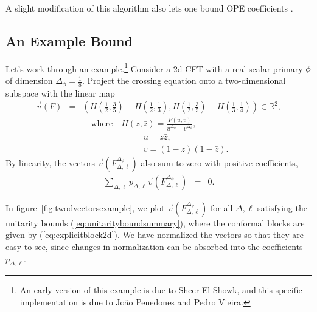 \documentclass{ws-rv9x6}
\newcommand\be{\begin{eqnarray}}
\newcommand\ee{\end{eqnarray}}
\newcommand\f\phi
\newcommand\p[1]{\left(#1\right)}
\newcommand\<\langle
\renewcommand\>\rangle
\newcommand\R{\mathbb{R}}
\newcommand\nn{\nonumber}
\renewcommand\.{\cdot}
\newcommand\De{\Delta}
\begin{document}
A slight modification of this algorithm also lets one bound OPE coefficients \cite{Caracciolo:2009bx}.

\subsection{An Example Bound}
\label{sec:boundsexample}

Let's work through an example.\footnote{An early version of this example is due to Sheer El-Showk, and this specific implementation is due to Jo\~ao Penedones and Pedro Vieira.}  Consider a 2d CFT with a real scalar primary $\f$ of dimension $\De_\f=\frac 1 8$.
Project the crossing equation onto a two-dimensional subspace with the linear map
\be
\label{eq:vecv}
\vec v(F) &=& \p{H\p{\frac 1 2,\frac 3 5} - H\p{\frac 1 2, \frac 1 3}, H\p{\frac 1 2,\frac 3 5} - H\p{\frac 1 3, \frac 1 4}}\in \R^2,\nn\\
&&\quad \textrm{where}\quad H(z,\bar z) = \frac{F(u,v)}{u^{\De_\f}-v^{\De_\f}},\nn\\
&&\qquad \qquad \qquad\,\,\,\,\,\,\, u=z\bar z,\nn\\
&&\qquad \qquad \qquad\,\,\,\,\,\,\, v= (1-z)(1-\bar z).
\ee
By linearity, the vectors $\vec v(F_{\De,\ell}^{\De_\f})$ also sum to zero with positive coefficients,
\be
\label{eq:finitedimensionalcrossing}
\sum_{\De,\ell} p_{\De,\ell} \vec v(F_{\De,\ell}^{\De_\f}) &=& 0.
\ee

In figure~\ref{fig:twodvectorsexample}, we plot $\vec v(F_{\De,\ell}^{\De_\f})$ for all $\De,\ell$ satisfying the unitarity bounds (\ref{eq:unitarityboundsummary}), where the conformal blocks are given by (\ref{eq:explicitblock2d}).  We have normalized the vectors so that they are easy to see, since changes in normalization can be absorbed into the coefficients $p_{\De,\ell}$.
\end{document}
